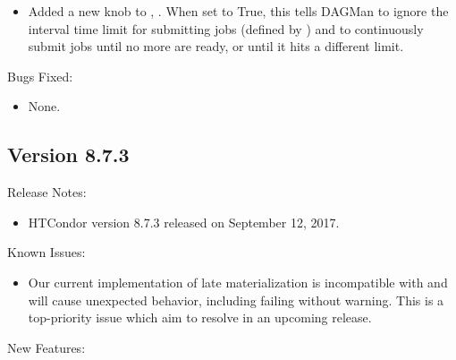 \begin{itemize}
\item Added a new knob to , .
When set to True, this tells DAGMan to ignore the interval time limit for 
submitting jobs (defined by ) and to 
continuously submit jobs until no more are ready, or until it hits a different
limit. 

\end{itemize}

\noindent Bugs Fixed:

\begin{itemize}

\item None.

\end{itemize}

\subsection*{\label{sec:New-8-7-3}Version 8.7.3}

\noindent Release Notes:

\begin{itemize}

\item HTCondor version 8.7.3 released on September 12, 2017.

\end{itemize}

\noindent Known Issues:

\begin{itemize}

\item Our current implementation of late materialization is incompatible with
 and will cause unexpected behavior, including failing without
warning. This is a top-priority issue which aim to resolve in an upcoming
release.

\end{itemize}

\noindent New Features:


